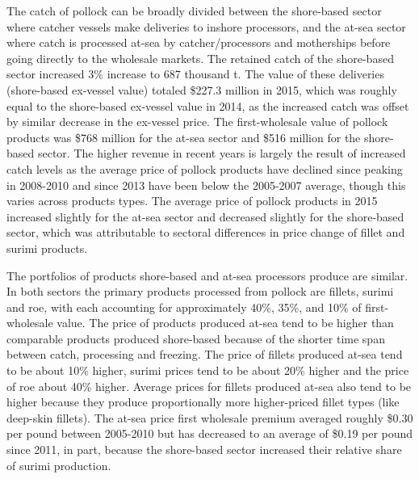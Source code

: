 The catch of pollock can be broadly divided between the shore-based
sector where catcher vessels make deliveries to inshore processors, and
the at-sea sector where catch is processed at-sea by catcher/processors
and motherships before going directly to the wholesale markets. The
retained catch of the shore-based sector increased 3\% increase to 687
thousand t. The value of these deliveries (shore-based ex-vessel value)
totaled \$227.3 million in 2015, which was roughly equal to the
shore-based ex-vessel value in 2014, as the increased catch was offset
by similar decrease in the ex-vessel price. The first-wholesale value of
pollock products was \$768 million for the at-sea sector and \$516
million for the shore-based sector. The higher revenue in recent years
is largely the result of increased catch levels as the average price of
pollock products have declined since peaking in 2008-2010 and since 2013
have been below the 2005-2007 average, though this varies across
products types. The average price of pollock products in 2015 increased
slightly for the at-sea sector and decreased slightly for the
shore-based sector, which was attributable to sectoral differences in
price change of fillet and surimi products.

The portfolios of products shore-based and at-sea processors produce are
similar. In both sectors the primary products processed from pollock are
fillets, surimi and roe, with each accounting for approximately 40\%,
35\%, and 10\% of first-wholesale value. The price of products produced
at-sea tend to be higher than comparable products produced shore-based
because of the shorter time span between catch, processing and freezing.
The price of fillets produced at-sea tend to be about 10\% higher,
surimi prices tend to be about 20\% higher and the price of roe about
40\% higher. Average prices for fillets produced at-sea also tend to be
higher because they produce proportionally more higher-priced fillet
types (like deep-skin fillets). The at-sea price first wholesale premium
averaged roughly \$0.30 per pound between 2005-2010 but has decreased to
an average of \$0.19 per pound since 2011, in part, because the
shore-based sector increased their relative share of surimi production.

